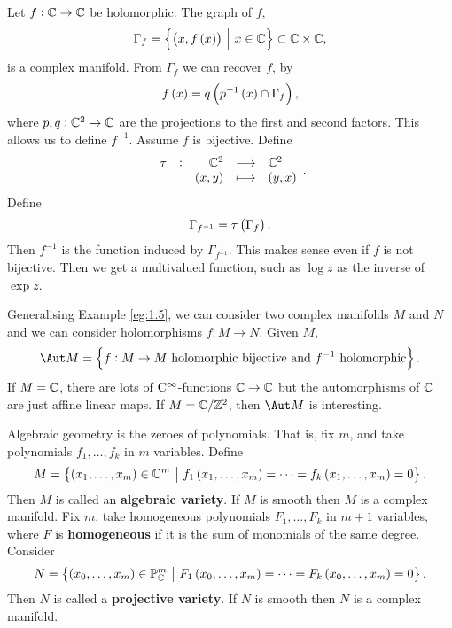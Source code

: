 \begin{example}
\label{eg:1.5}
Let $ f : \mathbb{C} \to \mathbb{C} $ be holomorphic. The graph of $ f $,
$$ \Gamma_f = \cbr{\br{x, f\br{x}} \st x \in \CC} \subset \CC \times \CC, $$
is a complex manifold. From $ \Gamma_f $ we can recover $ f $, by
$$ f\br{x} = q\br{p^{-1}\br{x} \cap \Gamma_f}, $$
where $ p, q : \mathbb{C}^2 \to \mathbb{C} $ are the projections to the first and second factors. This allows us to define $ f^{-1} $. Assume $ f $ is bijective. Define
$$ \function[\tau]{\CC^2}{\CC^2}{\br{x, y}}{\br{y, x}}. $$
Define
$$ \Gamma_{f^{-1}} = \tau\br{\Gamma_f}. $$
Then $ f^{-1} $ is the function induced by $ \Gamma_{f^{-1}} $. This makes sense even if $ f $ is not bijective. Then we get a multivalued function, such as $ \log z $ as the inverse of $ \exp z $.
\end{example}

\begin{example}
Generalising Example \ref{eg:1.5}, we can consider two complex manifolds $ M $ and $ N $ and we can consider holomorphisms $ f : M \to N $. Given $ M $,
$$ \Aut M = \cbr{f : M \to M \ \text{holomorphic bijective and} \ f^{-1} \ \text{holomorphic}}. $$
If $ M = \mathbb{C} $, there are lots of $ \mathrm{C}^\infty $-functions $ \mathbb{C} \to \mathbb{C} $ but the automorphisms of $ \mathbb{C} $ are just affine linear maps. If $ M = \mathbb{C} / \mathbb{Z}^2 $, then $ \Aut M $ is interesting.
\end{example}

\pagebreak

\begin{example}
Algebraic geometry is the zeroes of polynomials. That is, fix $ m $, and take polynomials $ f_1, \dots, f_k $ in $ m $ variables. Define
$$ M = \cbr{\br{x_1, \dots, x_m} \in \CC^m \st f_1\br{x_1, \dots, x_m} = \dots = f_k\br{x_1, \dots, x_m} = 0}. $$
Then $ M $ is called an \textbf{algebraic variety}. If $ M $ is smooth then $ M $ is a complex manifold. Fix $ m $, take homogeneous polynomials $ F_1, \dots, F_k $ in $ m + 1 $ variables, where $ F $ is \textbf{homogeneous} if it is the sum of monomials of the same degree. Consider
$$ N = \cbr{\br{x_0, \dots, x_m} \in \PP_\CC^m \st F_1\br{x_0, \dots, x_m} = \dots = F_k\br{x_0, \dots, x_m} = 0}. $$
Then $ N $ is called a \textbf{projective variety}. If $ N $ is smooth then $ N $ is a complex manifold.
\end{example}

